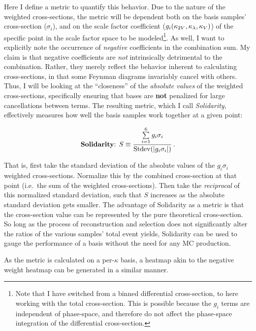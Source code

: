    Here I define a metric to quantify this behavior.
    Due to the nature of the weighted cross-sections,
        the metric will be dependent both on the basis samples' cross-section ($\sigma_i$),
        and on the scale factor coefficient ($g_i(\kappa_{2V},\kappa_{\lambda},\kappa_{V})$) of the specific point in the scale factor space to be modeled\footnote{
            Note that I have switched from a binned differential cross-section, to here working with the total cross-section.
            This is possible because the $g_i$ terms are independent of phase-space,
                and therefore do not affect the phase-space integration of the differential cross-section.
        }.
    As well, I want to explicitly note the occurrence of \textit{negative} coefficients in the combination sum.
    My claim is that negative coefficients are \textit{not} intrinsically detrimental to the combination.
    Rather, they merely reflect the behavior inherent to calculating cross-sections,
        in that some Feynman diagrams invariably cancel with others.
    Thus, I will be looking at the ``closeness'' of the \textit{absolute values} of the weighted cross-sections,
        specifically ensuring that bases are \textbf{not} penalized for large cancellations between terms.
    The resulting metric, which I call \textit{Solidarity}, effectively measures how well the basis samples work together at a given point:

    \begin{equation}
        \textrm{\textbf{Solidarity}: }S \equiv \frac{ \sum\limits_{i=1}^6 g_i\sigma_i }{ \textrm{Stdev}(|g_i\sigma_i|) }
        \,.
    \end{equation}

    That is, first take the standard deviation of the absolute values of the $ g_i \sigma_i $ weighted cross-sections.
    Normalize this by the combined cross-section at that point (i.e.\ the sum of the weighted cross-sections).
    Then take the \textit{reciprocal} of this normalized standard deviation,
        such that $S$ increases as the absolute standard deviation gets smaller.
    The advantage of Solidarity as a metric
        is that the cross-section value can be represented by the pure theoretical cross-section.
    So long as the process of reconstruction and selection does not significantly alter the ratios of the various samples' total event yields,
        Solidarity can be used to gauge the performance of a basis without the need for any MC production.

    As the metric is calculated on a per-$\kappa$ basis,
        a heatmap akin to the negative weight heatmap can be generated in a similar manner.

